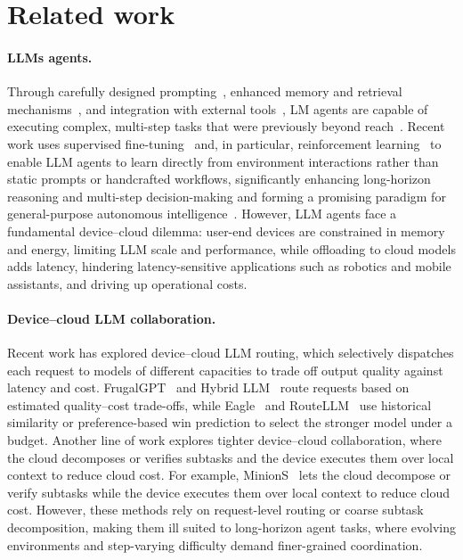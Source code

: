 \documentclass{article}
\begin{document}
\section{Related work}
\label{subsec::related_work}

\paragraph{LLMs agents.}
Through carefully designed prompting~\citep{Yao2023ReAct,shinn2023reflexion}, enhanced memory and retrieval mechanisms~\citep{wang2024mobile,xu2025amem}, and integration with external tools~\citep{schick2023toolformer,xie2024osworld}, LM agents are capable of executing complex, multi-step tasks that were previously beyond reach~\citep{chang2024agentboard,xie2024travelplanner,wangvagen}.
Recent work uses supervised fine-tuning~\citep{xia2025sand,zhang2024you,li2026reasoning} and, in particular, reinforcement learning~\citep{fenggroup,mai2025agentic,zhang2026land} to enable LLM agents to learn directly from environment interactions rather than static prompts or handcrafted workflows, significantly enhancing long-horizon reasoning and multi-step decision-making and forming a promising paradigm for general-purpose autonomous intelligence~\citep{comanici2025gemini,qwen3.5,liu2025deepseek}.
However, LLM agents face a fundamental device--cloud dilemma: user-end devices are constrained in memory and energy, limiting LLM scale and performance, while offloading to cloud models adds latency, hindering latency-sensitive applications such as robotics and mobile assistants, and driving up operational costs.

\paragraph{Device--cloud LLM collaboration.}
Recent work has explored device--cloud LLM routing, which selectively dispatches each request to models of different capacities to trade off output quality against latency and cost.
FrugalGPT~\citep{chen2024frugalgpt} and Hybrid LLM~\citep{ding2024hybrid} route requests based on estimated quality--cost trade-offs, while Eagle~\citep{Eagle2024} and RouteLLM~\citep{ongroutellm} use historical similarity or preference-based win prediction to select the stronger model under a budget.
Another line of work explores tighter device--cloud collaboration, where the cloud decomposes or verifies subtasks and the device executes them over local context to reduce cloud cost.
For example, MinionS~\citep{narayan2025cost} lets the cloud decompose or verify subtasks while the device executes them over local context to reduce cloud cost.
However, these methods rely on request-level routing or coarse subtask decomposition, making them ill suited to long-horizon agent tasks, where evolving environments and step-varying difficulty demand finer-grained coordination.
\end{document}
